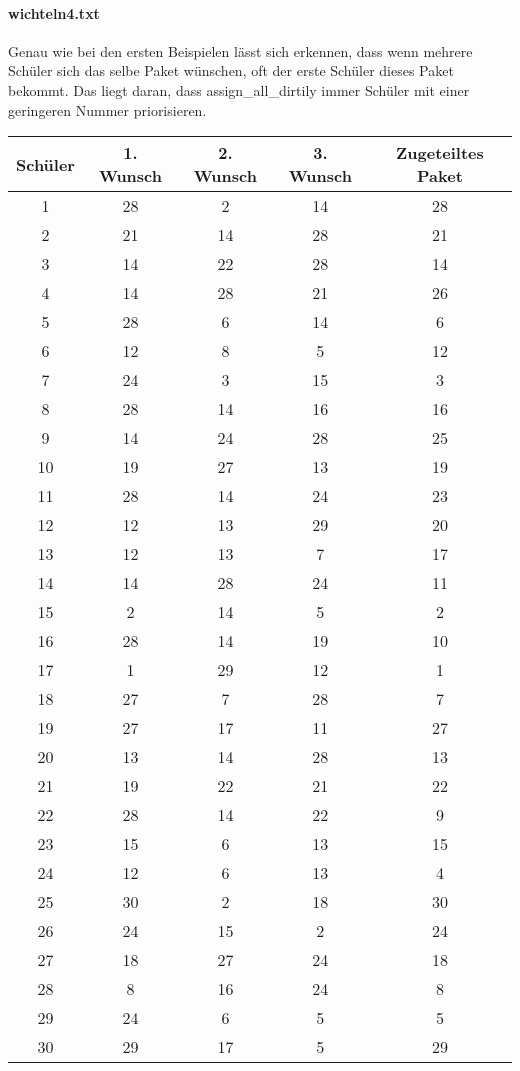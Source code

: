 \documentclass[a4paper,10pt,ngerman]{scrartcl}
\begin{document}
\paragraph{wichteln4.txt}
Genau wie bei den ersten Beispielen lässt sich erkennen, dass wenn mehrere Schüler sich das selbe Paket wünschen, oft der erste Schüler dieses Paket bekommt.
Das liegt daran, dass assign\_all\_dirtily immer Schüler mit einer geringeren Nummer priorisieren.
\begin{longtable}[c]{c|c|c|c|c}
    Schüler & 1. Wunsch & 2. Wunsch & 3. Wunsch & Zugeteiltes Paket \\
    \hline
    \endhead
    1 & 28 & 2 & 14 & 28 \\
    2 & 21 & 14 & 28 & 21 \\
    3 & 14 & 22 & 28 & 14 \\
    4 & 14 & 28 & 21 & 26 \\
    5 & 28 & 6 & 14 & 6 \\
    6 & 12 & 8 & 5 & 12 \\
    7 & 24 & 3 & 15 & 3 \\
    8 & 28 & 14 & 16 & 16 \\
    9 & 14 & 24 & 28 & 25 \\
    10 & 19 & 27 & 13 & 19 \\
    11 & 28 & 14 & 24 & 23 \\
    12 & 12 & 13 & 29 & 20 \\
    13 & 12 & 13 & 7 & 17 \\
    14 & 14 & 28 & 24 & 11 \\
    15 & 2 & 14 & 5 & 2 \\
    16 & 28 & 14 & 19 & 10 \\
    17 & 1 & 29 & 12 & 1 \\
    18 & 27 & 7 & 28 & 7 \\
    19 & 27 & 17 & 11 & 27 \\
    20 & 13 & 14 & 28 & 13 \\
    21 & 19 & 22 & 21 & 22 \\
    22 & 28 & 14 & 22 & 9 \\
    23 & 15 & 6 & 13 & 15 \\
    24 & 12 & 6 & 13 & 4 \\
    25 & 30 & 2 & 18 & 30 \\
    26 & 24 & 15 & 2 & 24 \\
    27 & 18 & 27 & 24 & 18 \\
    28 & 8 & 16 & 24 & 8 \\
    29 & 24 & 6 & 5 & 5 \\
    30 & 29 & 17 & 5 & 29
\end{longtable}
\end{document}
